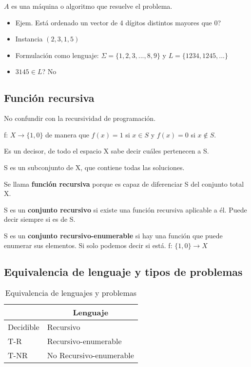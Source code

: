 $A$ es una máquina o algoritmo que resuelve el problema.

\begin{itemize}
    \item Ejem. Está ordenado un vector de 4 dígitos distintos mayores que 0?
    \item Instancia $(2, 3, 1, 5)$
    \item Formulación como lenguaje: $\Sigma = \{1,2,3,...,8,9\}$ y $L=\{1234,1245,...\}$
    \item $3145 \in L$? No
\end{itemize}
\pagebreak

\subsection{Función recursiva}
No confundir con la recursividad de programación.

f: $X \rightarrow \{1,0\}$ de manera que $f(x) = 1$ si $x \in S$ y $f(x) = 0$ si $x \notin S$.

Es un decisor, de todo el espacio X sabe decir cuáles pertenecen a S.

S es un subconjunto de X, que contiene todas las soluciones.

Se llama \textbf{función recursiva} porque es capaz de diferenciar S del conjunto total X.

S es un \textbf{conjunto recursivo} si existe una función recursiva aplicable a él. Puede decir siempre si es de S.

S es un \textbf{conjunto recursivo-enumerable} si hay una función que puede enumerar sus elementos. Si solo podemos decir si está. f: $\{1,0\}\rightarrow X$

\subsection{Equivalencia de lenguaje y tipos de problemas}
\begin{table}[H]
    \begin{tabular}{|l|l|}
    \hline
    \rowcolor[HTML]{BFBFBF} 
    \multicolumn{1}{|c|}{\cellcolor[HTML]{BFBFBF}Problema} & \multicolumn{1}{c|}{\cellcolor[HTML]{BFBFBF}Lenguaje} \\ \hline
    Decidible                                              & Recursivo                                             \\ \hline
    T-R                                                    & Recursivo-enumerable                                  \\ \hline
    T-NR                                                   & No Recursivo-enumerable                               \\ \hline
    \end{tabular}
    \caption{Equivalencia de lenguajes y problemas}
\end{table}

